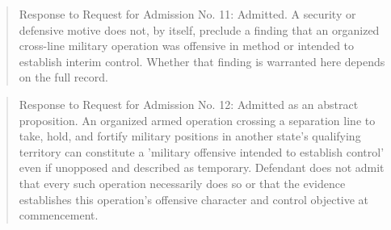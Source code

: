 \begin{quote}
Response to Request for Admission No. 11: Admitted. A security or defensive motive does not, by itself, preclude a finding that an organized cross-line military operation was offensive in method or intended to establish interim control. Whether that finding is warranted here depends on the full record.
\end{quote}

\begin{quote}
Response to Request for Admission No. 12: Admitted as an abstract proposition. An organized armed operation crossing a separation line to take, hold, and fortify military positions in another state's qualifying territory can constitute a 'military offensive intended to establish control' even if unopposed and described as temporary. Defendant does not admit that every such operation necessarily does so or that the evidence establishes this operation's offensive character and control objective at commencement.
\end{quote}

